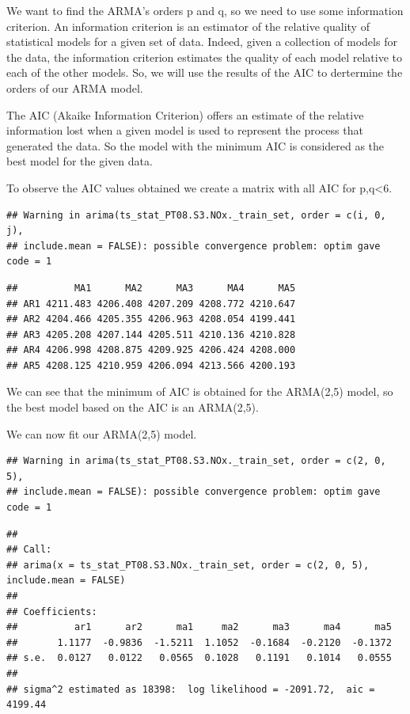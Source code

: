 \documentclass[]{article}
\begin{document}
We want to find the ARMA's orders p and q, so we need to use some
information criterion. An information criterion is an estimator of the
relative quality of statistical models for a given set of data. Indeed,
given a collection of models for the data, the information criterion
estimates the quality of each model relative to each of the other
models. So, we will use the results of the AIC to dertermine the orders
of our ARMA model.

The AIC (Akaike Information Criterion) offers an estimate of the
relative information lost when a given model is used to represent the
process that generated the data. So the model with the minimum AIC is
considered as the best model for the given data.

To observe the AIC values obtained we create a matrix with all AIC for
p,q\textless{}6.

\begin{verbatim}
## Warning in arima(ts_stat_PT08.S3.NOx._train_set, order = c(i, 0, j),
## include.mean = FALSE): possible convergence problem: optim gave code = 1
\end{verbatim}

\begin{verbatim}
##          MA1      MA2      MA3      MA4      MA5
## AR1 4211.483 4206.408 4207.209 4208.772 4210.647
## AR2 4204.466 4205.355 4206.963 4208.054 4199.441
## AR3 4205.208 4207.144 4205.511 4210.136 4210.828
## AR4 4206.998 4208.875 4209.925 4206.424 4208.000
## AR5 4208.125 4210.959 4206.094 4213.566 4200.193
\end{verbatim}

We can see that the minimum of AIC is obtained for the ARMA(2,5) model,
so the best model based on the AIC is an ARMA(2,5).

We can now fit our ARMA(2,5) model.

\begin{verbatim}
## Warning in arima(ts_stat_PT08.S3.NOx._train_set, order = c(2, 0, 5),
## include.mean = FALSE): possible convergence problem: optim gave code = 1
\end{verbatim}

\begin{verbatim}
## 
## Call:
## arima(x = ts_stat_PT08.S3.NOx._train_set, order = c(2, 0, 5), include.mean = FALSE)
## 
## Coefficients:
##          ar1      ar2      ma1     ma2      ma3      ma4      ma5
##       1.1177  -0.9836  -1.5211  1.1052  -0.1684  -0.2120  -0.1372
## s.e.  0.0127   0.0122   0.0565  0.1028   0.1191   0.1014   0.0555
## 
## sigma^2 estimated as 18398:  log likelihood = -2091.72,  aic = 4199.44
\end{verbatim}
\end{document}
